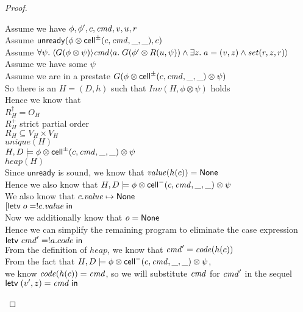 \begin{proof}
\begin{tabbedproof}
\oo Assume we have $\phi, \phi', c, \mathit{cmd}, v, u, r$ \\
\oo Assume $\mathsf{unready}({\phi \otimes \mathsf{cell}^{\pm}({c}, {\mathit{cmd}}, {\_}, {\_})}, {c})$ \\
\oo Assume $\forall \psi.\; 
       \langle{G(\phi \otimes \psi)}\rangle{\mathit{cmd}}\langle{a}.\;{G(\phi' \otimes R(u, \psi)) \land \exists z.\; a = (v, z) \land \mathit{set}(r, z, r)}\rangle $ \\
\oo Assume we have some $\psi$ \\
\ooo Assume we are in a prestate $G(\phi \otimes \mathsf{cell}^{\pm}({c}, {\mathit{cmd}}, {\_}, {\_}) \otimes \psi)$ \\
\ooo So there is an $H = (D,h)$ such that $\mathit{Inv}(H, \phi \otimes \psi)$ holds \\
\ooo Hence we know that \\
\ooox $R^\dagger_H = O_H$ \\
\ooox $R^+_H$ strict partial order \\
\ooox $R_H \subseteq V_H \times V_H$ \\
\ooox $\mathit{unique}(H)$ \\
\ooox $H, D \models \phi \otimes \mathsf{cell}^{\pm}({c}, {\mathit{cmd}}, {\_}, {\_}) \otimes \psi$ \\
\ooox $\mathit{heap}(H)$ \\
\ooo Since $\mathsf{unready}$ is sound, we know that $\mathit{value}(h(c)) = \mathsf{None}$ \\
\ooo Hence we also know that $H, D \models \phi \otimes \mathsf{cell}^{-}({c}, {\mathit{cmd}}, {\_}, {\_}) \otimes \psi$ \\
\ooo We also know that $c.\mathit{value} \mapsto \mathsf{None}$ \\
\ooo $[\mathsf{letv}\;o = !c.\mathit{value}\;\mathsf{in}\;$ \\
\ooo Now we additionally know that $o = \mathsf{None}$ \\
\ooo Hence we can simplify the remaining program to eliminate the case expression \\
\ooo $\mathsf{letv}\;\mathit{cmd}' = !a.code\;\mathsf{in}\;$ \\
\ooo From the definition of $\mathit{heap}$, we know that $\mathit{cmd}' = \mathit{code}(h(c))$ \\
\ooo From the fact that $H, D \models \phi \otimes \mathsf{cell}^{-}({c}, {\mathit{cmd}}, {\_}, {\_}) \otimes \psi$, \\
\oox we know $\mathit{code}(h(c)) = \mathit{cmd}$, so we will substitute $\mathit{cmd}$ for $\mathit{cmd}'$ in the sequel \\
\ooo $\mathsf{letv}\;(v',z) = \mathit{cmd}\;\mathsf{in}\;$ \\

\end{tabbedproof}
\end{proof}
